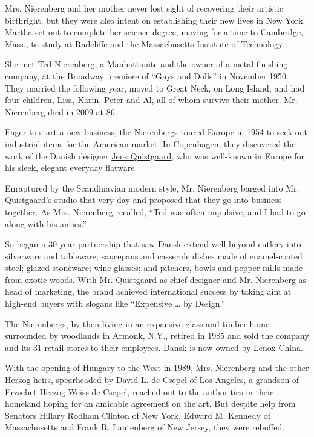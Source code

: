 Mrs. Nierenberg and her mother never lost sight of recovering their
artistic birthright, but they were also intent on establishing their new
lives in New York. Martha set out to complete her science degree, moving
for a time to Cambridge, Mass., to study at Radcliffe and the
Massachusetts Institute of Technology.

She met Ted Nierenberg, a Manhattanite and the owner of a metal
finishing company, at the Broadway premiere of ``Guys and Dolls'' in
November 1950. They married the following year, moved to Great Neck, on
Long Island, and had four children, Lisa, Karin, Peter and Al, all of
whom survive their mother.
\href{https://www.nytimes.com/2009/08/04/arts/design/04nierenberg.html}{Mr.
Nierenberg died in 2009 at 86.}

Eager to start a new business, the Nierenbergs toured Europe in 1954 to
seek out industrial items for the American market. In Copenhagen, they
discovered the work of the Danish designer
\href{https://www.nytimes.com/2008/02/02/arts/design/02quistgaard.html}{Jens
Quistgaard}, who was well-known in Europe for his sleek, elegant
everyday flatware.

Enraptured by the Scandinavian modern style, Mr. Nierenberg barged into
Mr. Quistgaard's studio that very day and proposed that they go into
business together. As Mrs. Nierenberg recalled, ``Ted was often
impulsive, and I had to go along with his antics.''

So began a 30-year partnership that saw Dansk extend well beyond cutlery
into silverware and tableware; saucepans and casserole dishes made of
enamel-coated steel; glazed stoneware; wine glasses; and pitchers, bowls
and pepper mills made from exotic woods. With Mr. Quistgaard as chief
designer and Mr. Nierenberg as head of marketing, the brand achieved
international success by taking aim at high-end buyers with slogans like
``Expensive \ldots{} by Design.''

The Nierenbergs, by then living in an expansive glass and timber home
surrounded by woodlands in Armonk, N.Y., retired in 1985 and sold the
company and its 31 retail stores to their employees. Dansk is now owned
by Lenox China.

With the opening of Hungary to the West in 1989, Mrs. Nierenberg and the
other Herzog heirs, spearheaded by David L. de Csepel of Los Angeles, a
grandson of Erzsebet Herzog Weiss de Csepel, reached out to the
authorities in their homeland hoping for an amicable agreement on the
art. But despite help from Senators Hillary Rodham Clinton of New York,
Edward M. Kennedy of Massachusetts and Frank R. Lautenberg of New
Jersey, they were rebuffed.

